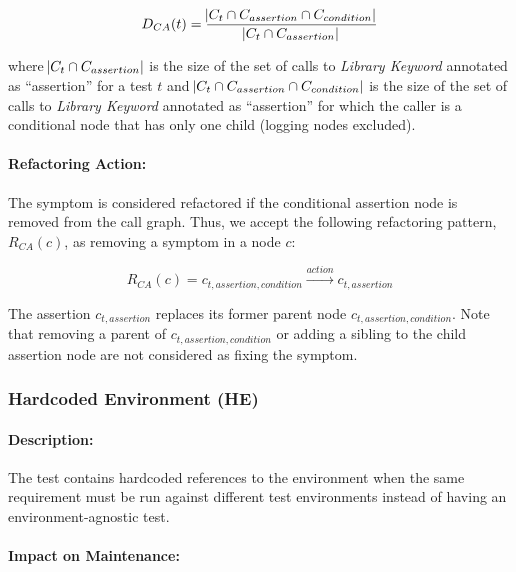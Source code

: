 \begin{equation*}
    D_{CA}(t) = \frac{\abs{C_{t} \cap C_{assertion} \cap C_{condition}}}{\abs{C_{t} \cap C_{assertion}}}
\end{equation*}

where $\abs{C_{t} \cap C_{assertion}}$ is the size of the set of calls to \emph{Library Keyword} annotated as ``assertion'' for a test $t$ and $\abs{C_{t} \cap C_{assertion} \cap C_{condition}}$  is the size of the set of calls to \emph{Library Keyword} annotated as ``assertion'' for which the caller is a conditional node that has only one child (logging nodes excluded).

\paragraph{Refactoring Action:}

The symptom is considered refactored if the conditional assertion node is removed from the call graph. Thus, we accept the following refactoring pattern, $R_{CA}(c)$, as removing a symptom in a node $c$:

\begin{equation*}
    R_{CA}(c) =  c_{t, assertion, condition} \xrightarrow{action} c_{t, assertion}
\end{equation*}

The assertion $c_{t, assertion}$ replaces its former parent node $c_{t, assertion, condition}$. Note that removing a parent of $c_{t, assertion, condition}$ or adding a sibling to the child assertion node are not considered as fixing the symptom.

\subsubsection{Hardcoded Environment (HE)}

\paragraph{Description:}

The test contains hardcoded references to the environment when the same requirement must be run against different test environments instead of having an environment-agnostic test.

\paragraph{Impact on Maintenance:} 

